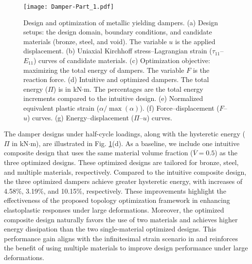 \documentclass[preprint,11pt]{elsarticle}
\theoremstyle{definition}
\begin{document}
\begin{figure}[!htbp]
    \centering
    \texttt{[image: Damper-Part\_1.pdf]}
    \caption{Design and optimization of metallic yielding dampers. (a) Design setups: the design domain, boundary conditions, and candidate materials (bronze, steel, and void). The variable $u$ is the applied displacement. (b) Uniaxial Kirchhoff stress--Lagrangian strain ($\tau_{11}$--$E_{11}$) curves of candidate materials. (c) Optimization objective: maximizing the total energy of dampers. The variable $F$ is the reaction force. (d) Intuitive and optimized dampers. The total energy ($\Pi$) is in kN$\cdot$m. The percentages are the total energy increments compared to the intuitive design. (e) Normalized equivalent plastic strain ($\alpha/\max (\alpha)$). (f) Force--displacement ($F$--$u$) curves. (g) Energy--displacement ($\Pi$--$u$) curves.}
    \label{Fig: Damper-Part 1}
\end{figure}

The damper designs under half-cycle loadings, along with the hysteretic energy ($\Pi$ in kN$\cdot$m), are illustrated in Fig. \ref{Fig: Damper-Part 1}(d). As a baseline, we include one intuitive composite design that uses the same material volume fraction ($\overline{V} = 0.5$) as the three optimized designs. These optimized designs are tailored for bronze, steel, and multiple materials, respectively. Compared to the intuitive composite design, the three optimized dampers achieve greater hysteretic energy, with increases of 4.58\%, 3.19\%, and 10.15\%, respectively. These improvements highlight the effectiveness of the proposed topology optimization framework in enhancing elastoplastic responses under large deformations. Moreover, the optimized composite design naturally favors the use of two materials and achieves higher energy dissipation than the two single-material optimized designs. This performance gain aligns with the infinitesimal strain scenario in \citet{jia_multimaterial_2025} and reinforces the benefit of using multiple materials to improve design performance under large deformations.
\end{document}
